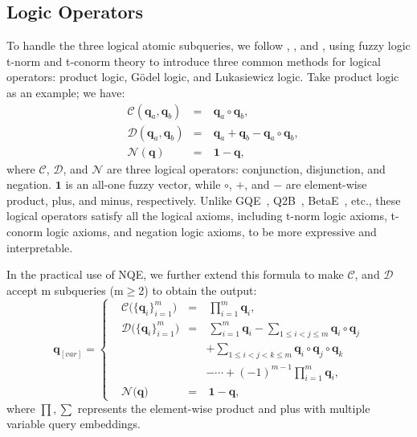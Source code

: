 \documentclass[letterpaper]{article} \usepackage{aaai23}  \usepackage{times}  \usepackage{helvet}  \usepackage{courier}  \usepackage[hyphens]{url}  \usepackage{graphicx} \urlstyle{rm} \def\UrlFont{\rm}  \usepackage{natbib}  \usepackage{caption} \frenchspacing  \setlength{\pdfpagewidth}{8.5in}  \setlength{\pdfpageheight}{11in}  \usepackage{algorithm}
\begin{document}
\subsection{Logic Operators}

To handle the three logical atomic subqueries, we follow \citep{CQD}, \citep{FuzzQE}, and \citep{GNN-QE}, using fuzzy logic t-norm and t-conorm theory to introduce three common methods for logical operators: product logic, Gödel logic, and Lukasiewicz logic. Take product logic as an example; we have:
\begin{equation}
\begin{aligned}
&\mathcal{C}(\boldsymbol{q}_{a},\boldsymbol{q}_{b})&=&\ \boldsymbol{q}_{a}\circ\boldsymbol{q}_{b},\\
&\mathcal{D}(\boldsymbol{q}_{a},\boldsymbol{q}_{b})&=&\ \boldsymbol{q}_{a}+\boldsymbol{q}_{b}-\boldsymbol{q}_{a}\circ\boldsymbol{q}_{b},\\
&\mathcal{N}(\boldsymbol{q})&=&\ \boldsymbol{1}-\boldsymbol{q},
\end{aligned}
\end{equation}
where $\mathcal{C}$, $\mathcal{D}$, and $\mathcal{N}$ are three logical operators: conjunction, disjunction, and negation. $\boldsymbol{1}$ is an all-one fuzzy vector, while $\circ$, $+$, and $-$ are element-wise product, plus, and minus, respectively. Unlike GQE~\citep{GQE}, Q2B~\citep{Q2B}, BetaE~\citep{BetaE}, etc., these logical operators satisfy all the logical axioms, including t-norm logic axioms, t-conorm logic axioms, and negation logic axioms, to be more expressive and interpretable.

In the practical use of NQE, we further extend this formula to make $\mathcal{C}$, and $\mathcal{D}$ accept m subqueries (m$\geq$2) to obtain the output:
\begin{equation}
\boldsymbol{q}_{[var]}=\left\{
\begin{aligned}
&\mathcal{C}\Big(\{\boldsymbol{q}_{i}\}_{i=1}^m\Big)&=&\ \prod_{i=1}^m\boldsymbol{q}_{i},\\
&\mathcal{D}\Big(\{\boldsymbol{q}_{i}\}_{i=1}^m\Big)&=&\ \sum_{i=1}^m\boldsymbol{q}_{i}-\sum_{1 \leq i<j \leq m}\boldsymbol{q}_{i} \circ \boldsymbol{q}_{j}\\&&&+\sum_{1 \leq i<j<k \leq m}\boldsymbol{q}_{i} \circ \boldsymbol{q}_{j} \circ \boldsymbol{q}_{k}\\&&&-\cdots+(-1)^{m-1}\prod_{i=1}^m\boldsymbol{q}_{i},\\
&\mathcal{N}\Big(\boldsymbol{q}\Big)&=&\ \boldsymbol{1}-\boldsymbol{q},
\end{aligned}
\right.
\end{equation}
where $\prod,\sum$ represents the element-wise product and plus with multiple variable query embeddings.
\end{document}
